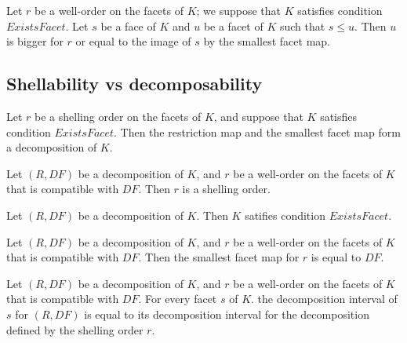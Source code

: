 \begin{sublemma}
Let $r$ be a well-order on the facets of $K$; we suppose that $K$ satisfies condition $ExistsFacet$.
Let $s$ be a face of $K$ and $u$ be a facet of $K$ such that $s\le u$. Then $u$ is bigger for $r$ or equal
to the image of $s$ by the smallest facet map.

\end{sublemma}


\subsection{Shellability vs decomposability}

\begin{sublemma}[ShellableIsDecomposable]
Let $r$ be a shelling order on the facets of $K$, and suppose that $K$ satisfies condition $ExistsFacet$. Then the restriction
map and the smallest facet map form a decomposition of $K$.

\end{sublemma}

\begin{sublemma}[ShellableofDecomposable]
Let $(R,DF)$ be a decomposition of $K$, and $r$ be a well-order on the facets of $K$ that is compatible with $DF$. Then $r$ is a
shelling order.

\end{sublemma}

\begin{sublemma}[ExistsFacetofDecomposable]
Let $(R,DF)$ be a decomposition of $K$. Then $K$ satifies condition $ExistsFacet$.

\end{sublemma}

\begin{sublemma}
Let $(R,DF)$ be a decomposition of $K$, and $r$ be a well-order on the facets of $K$ that is compatible with $DF$. Then the smallest facet
map for $r$ is equal to $DF$.

\end{sublemma}

\begin{sublemma}
Let $(R,DF)$ be a decomposition of $K$, and $r$ be a well-order on the facets of $K$ that is compatible with $DF$. For every facet
$s$ of $K$. the decomposition interval of $s$ for $(R,DF)$ is equal to its decomposition interval for the decomposition defined by
the shelling order $r$.

\end{sublemma}